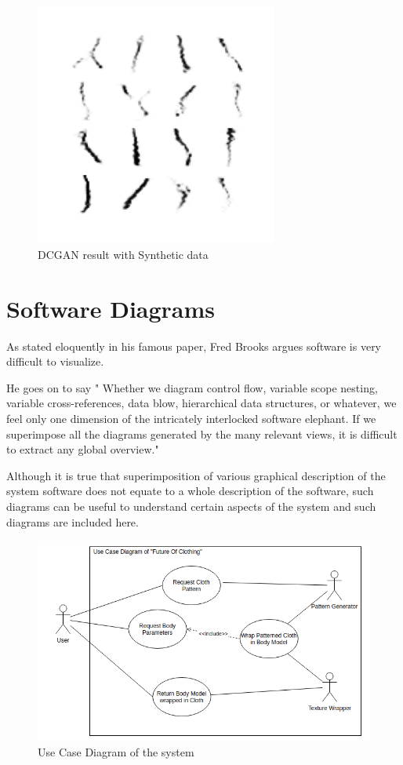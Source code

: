 \documentclass{article}
\begin{document}
\begin{figure}[H]
    \centering
    \includegraphics[width=8cm]{images/GAN/DCGANmodified.png}
    \caption{DCGAN result with Synthetic data}
\end{figure}

\section{Software Diagrams}

As stated eloquently in his famous paper, \cite{Brooks87nosilver} Fred Brooks argues software is very difficult to visualize.

He goes on to say " Whether we diagram control flow, variable scope nesting, variable cross-references, data blow, hierarchical data structures, or whatever, we feel only one dimension of the intricately interlocked software elephant. If we superimpose all the diagrams generated by the many relevant views, it is difficult to extract any global overview."

Although it is true that superimposition of various graphical description of the system software does not equate to a whole description of the software, such diagrams can be useful to understand certain aspects of the system and such diagrams are included here.

\begin{figure}[H]
    \includegraphics[scale=0.6]{images/softwareDiagrams/FinalSystemUseCase.png}
    \centering
    \caption{Use Case Diagram of the system}
\end{figure}
\end{document}
